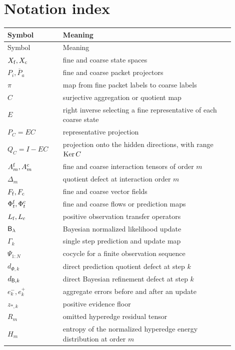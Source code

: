 \documentclass[11pt,oneside,openany]{book}
\numberwithin{equation}{section}
\begin{document}
\section{Notation index}\label{PRIQ:app:notation}
\begin{longtable}{@{}p{0.22\linewidth}p{0.68\linewidth}@{}}
\toprule
Symbol & Meaning\\
\midrule
\endfirsthead
\toprule
Symbol & Meaning\\
\midrule
\endhead
$X_{\mathrm f},X_{\mathrm c}$ & fine and coarse state spaces\\
$P_i,\overline P_a$ & fine and coarse packet projectors\\
$\pi$ & map from fine packet labels to coarse labels\\
$C$ & surjective aggregation or quotient map\\
$E$ & right inverse selecting a fine representative of each coarse state\\
$P_C=EC$ & representative projection\\
$Q_C=I-EC$ & projection onto the hidden directions, with range $\operatorname{Ker} C$\\
$A_m^{\mathrm f},A_m^{\mathrm c}$ & fine and coarse interaction tensors of order $m$\\
$\Delta_m$ & quotient defect at interaction order $m$\\
$F_{\mathrm f},F_{\mathrm c}$ & fine and coarse vector fields\\
$\Phi_t^{\mathrm f},\Phi_t^{\mathrm c}$ & fine and coarse flows or prediction maps\\
$L_{\mathrm f},L_{\mathrm c}$ & positive observation transfer operators\\
$\mathsf B_{\lambda}$ & Bayesian normalized likelihood update\\
$\Gamma_k$ & single step prediction and update map\\
$\Psi_{1:N}$ & cocycle for a finite observation sequence\\
$d_{\Phi,k}$ & direct prediction quotient defect at step $k$\\
$d_{\mathsf B,k}$ & direct Bayesian refinement defect at step $k$\\
$e_k^-,e_k^+$ & aggregate errors before and after an update\\
$z_{*,k}$ & positive evidence floor\\
$R_m$ & omitted hyperedge residual tensor\\
$H_m$ & entropy of the normalized hyperedge energy distribution at order $m$\\
\bottomrule
\end{longtable}
\end{document}
